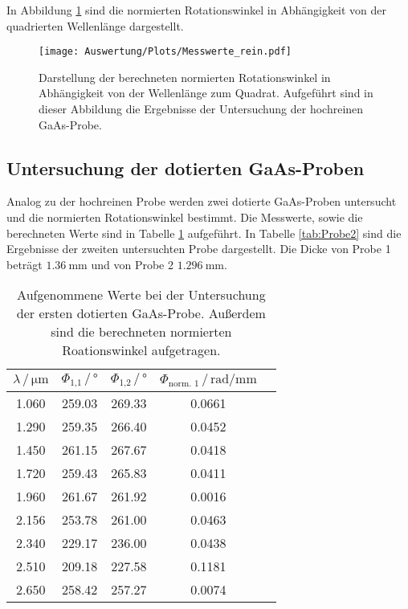    In Abbildung \ref{fig:hr_Messung} sind die normierten Rotationswinkel in Abhängigkeit von der quadrierten
   Wellenlänge dargestellt.
   \begin{figure}[H]
       \centering
       \texttt{[image: Auswertung/Plots/Messwerte\_rein.pdf]}
       \caption{Darstellung der berechneten normierten Rotationswinkel in Abhängigkeit von der Wellenlänge
       zum Quadrat. Aufgeführt sind in dieser Abbildung die Ergebnisse der Untersuchung der hochreinen GaAs-Probe. }
       \label{fig:hr_Messung}
   \end{figure}

   \subsection{Untersuchung der dotierten GaAs-Proben}
   Analog zu der hochreinen Probe werden zwei dotierte GaAs-Proben untersucht und die normierten Rotationswinkel
   bestimmt. Die Messwerte, sowie die berechneten Werte sind in Tabelle \ref{tab:Probe1} aufgeführt.
   In Tabelle \ref{tab:Probe2} sind die Ergebnisse der zweiten untersuchten Probe dargestellt.
   Die Dicke von Probe 1 beträgt $\SI{1.36}{\milli\meter}$ und von Probe 2 $\SI{1.296}{\milli\meter}$.
   \begin{table}[H]
     \centering
     \caption{Aufgenommene Werte bei der Untersuchung der ersten dotierten GaAs-Probe. Außerdem sind die
     berechneten normierten Roationswinkel aufgetragen.}
     \label{tab:Probe1}
     \begin{tabular}{ccccc}
       \toprule
       $\lambda\, / \, \si{\micro\meter}$ & $\Phi_\text{1,1} \, / \, \si{\degree}$ & $\Phi_\text{1,2} \, / \, \si{\degree}$ & $\Phi_\text{norm. 1} \, / \, \si{\radian\per\milli\meter}$  \\
       \midrule
       \num{1.060} & \num{259.03} & \num{269.33} & \num{0.0661}  \\
       \num{1.290} & \num{259.35} & \num{266.40} & \num{0.0452}  \\
       \num{1.450} & \num{261.15} & \num{267.67} & \num{0.0418}  \\
       \num{1.720} & \num{259.43} & \num{265.83} & \num{0.0411}  \\
       \num{1.960} & \num{261.67} & \num{261.92} & \num{0.0016}  \\
       \num{2.156} & \num{253.78} & \num{261.00} & \num{0.0463}  \\
       \num{2.340} & \num{229.17} & \num{236.00} & \num{0.0438}  \\
       \num{2.510} & \num{209.18} & \num{227.58} & \num{0.1181}  \\
       \num{2.650} & \num{258.42} & \num{257.27} & \num{0.0074}  \\
       \bottomrule
     \end{tabular}
     \end{table} \noindent

